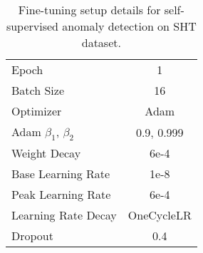 \begin{table}[h]
    \centering
    \caption{Fine-tuning setup details for self-supervised anomaly detection on SHT \cite{liu2018future} dataset.}
    \begin{tabular}{l c}
        \toprule
        \toprule
        Epoch                         & 1                            \\ 
        Batch Size                    & 16                             \\ 
        Optimizer                     & Adam                        \\ 
        Adam \(\beta_1\), \(\beta_2\) & 0.9, 0.999                    \\ 
        Weight Decay                  & 6e-4                          \\ 
        Base Learning Rate             & 1e-8                        \\ 
        Peak Learning Rate             & 6e-4                        \\ 
        Learning Rate Decay           & OneCycleLR                        \\ 
        Dropout                       & 0.4                           \\ \bottomrule
    \end{tabular}
    \label{tab:fine_tuning_setup_dt3}
\end{table}

